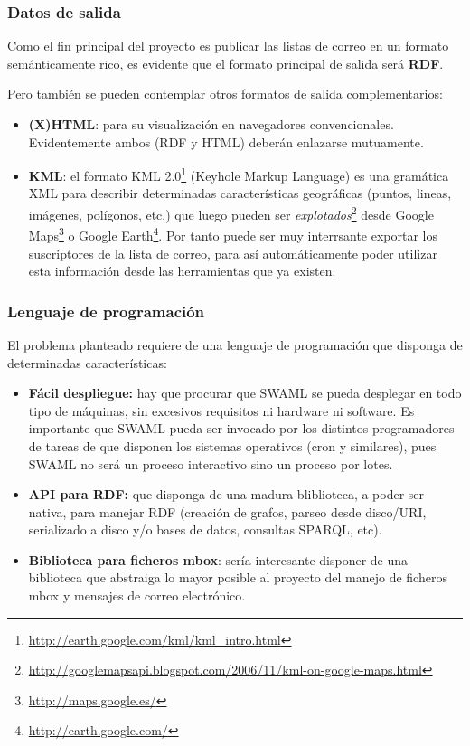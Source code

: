 \subsubsection{Datos de salida}

Como el fin principal del proyecto es publicar las listas de correo en un
formato semánticamente rico, es evidente que el formato principal de salida
será \textbf{RDF}.

Pero también se pueden contemplar otros formatos de salida complementarios:

\begin{itemize}
  \item \textbf{(X)HTML}: para su visualización en navegadores convencionales.
	Evidentemente ambos (RDF y HTML) deberán enlazarse mutuamente.
  \item \textbf{KML}: el formato KML 2.0\footnote{\url{http://earth.google.com/kml/kml_intro.html}}
	(Keyhole Markup Language) es una gramática XML para describir determinadas
	características geográficas (puntos, lineas, imágenes, polígonos, etc.)
	que luego pueden ser 
	\emph{explotados}\footnote{\url{http://googlemapsapi.blogspot.com/2006/11/kml-on-google-maps.html}} 
	desde Google Maps\footnote{\url{http://maps.google.es/}} o
	Google Earth\footnote{\url{http://earth.google.com/}}. Por tanto
	puede ser muy interrsante exportar los suscriptores de la lista de
	correo, para así automáticamente poder utilizar esta información
	desde las herramientas que ya existen.
\end{itemize}

\subsubsection{Lenguaje de programación}

El problema planteado requiere de una lenguaje de programación que disponga
de determinadas características:

\begin{itemize}
  \item \textbf{Fácil despliegue:} hay que procurar que SWAML se pueda desplegar 
	en todo tipo de máquinas, sin excesivos requisitos ni hardware ni software.
	Es importante que SWAML pueda ser invocado por los distintos programadores
	de tareas de que disponen los sistemas operativos (cron y similares), pues
	SWAML no será un proceso interactivo sino un proceso por lotes.
  \item \textbf{API para RDF:} que disponga de una madura bliblioteca, a poder ser 
	nativa, para manejar RDF (creación de grafos, parseo desde disco/URI, 
	serializado a disco y/o bases de datos, consultas SPARQL, etc).
  \item \textbf{Biblioteca para ficheros mbox}: sería interesante disponer de una 
	biblioteca que abstraiga lo mayor posible al proyecto del manejo de ficheros
	mbox\cite{Hall2005} y mensajes de correo electrónico\cite{Resnick2001}.
\end{itemize}

